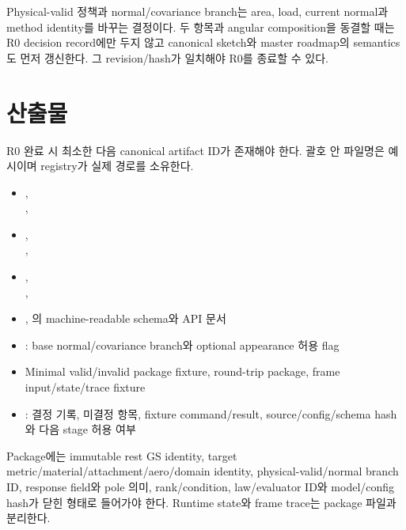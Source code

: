 \documentclass[10pt]{article}
\begin{document}
Physical-valid 정책과 normal/covariance branch는 area, load, current normal과 method identity를 바꾸는
결정이다. 두 항목과 angular composition을 동결할 때는 R0 decision record에만 두지 않고 canonical
sketch와 master roadmap의 semantics도 먼저 갱신한다. 그 revision/hash가 일치해야 R0를 종료할 수 있다.

\section{산출물}
\label{sec:r0-chapter-6}

R0 완료 시 최소한 다음 canonical artifact ID가 존재해야 한다. 괄호 안 파일명은 예시이며 registry가 실제 경로를 소유한다.

\begin{itemize}
  \item {}, \\
  , 
  \item {}, \\
  , 
  \item {}, \\
  , 
  \item {}, 의 machine-readable schema와 API 문서
  \item {}: base normal/covariance branch와 optional appearance 허용 flag
  \item Minimal valid/invalid package fixture, round-trip package, frame input/state/trace fixture
  \item {}: 결정 기록, 미결정 항목, fixture command/result,
  source/config/schema hash와 다음 stage 허용 여부
\end{itemize}

Package에는 immutable rest GS identity, target metric/material/attachment/aero/domain identity,
physical-valid/normal branch ID, response field와 pole 의미, rank/condition, law/evaluator ID와 model/config hash가
닫힌 형태로 들어가야 한다. Runtime state와 frame trace는 package 파일과 분리한다.
\end{document}
